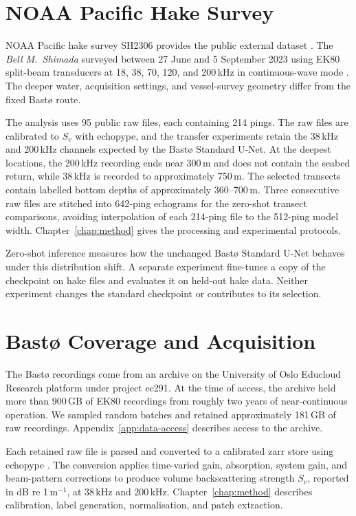 \section{NOAA Pacific Hake Survey}
\label{sec:noaa-transfer}

NOAA Pacific hake survey SH2306 provides the public external dataset \cite{noaa_sh2306_ek80}. The \textit{Bell M.\ Shimada} surveyed between 27 June and 5 September 2023 using EK80 split-beam transducers at 18, 38, 70, 120, and 200\,kHz in continuous-wave mode \cite{clemons_hake_2024}. The deeper water, acquisition settings, and vessel-survey geometry differ from the fixed Bast\o{} route.

The analysis uses 95 public raw files, each containing 214 pings. The raw files are calibrated to $S_v$ with echopype, and the transfer experiments retain the 38\,kHz and 200\,kHz channels expected by the Bast\o{} Standard U-Net. At the deepest locations, the 200\,kHz recording ends near 300\,m and does not contain the seabed return, while 38\,kHz is recorded to approximately 750\,m. The selected transects contain labelled bottom depths of approximately 360--700\,m. Three consecutive raw files are stitched into 642-ping echograms for the zero-shot transect comparisons, avoiding interpolation of each 214-ping file to the 512-ping model width. Chapter~\ref{chap:method} gives the processing and experimental protocols.

Zero-shot inference measures how the unchanged Bast\o{} Standard U-Net behaves under this distribution shift. A separate experiment fine-tunes a copy of the checkpoint on hake files and evaluates it on held-out hake data. Neither experiment changes the standard checkpoint or contributes to its selection.

\section{Bast\o{} Coverage and Acquisition}

The Bast\o{} recordings come from an archive on the University of Oslo Educloud Research platform under project ec291. At the time of access, the archive held more than 900\,GB of EK80 recordings from roughly two years of near-continuous operation. We sampled random batches and retained approximately 181\,GB of raw recordings. Appendix~\ref{app:data-access} describes access to the archive.

Each retained raw file is parsed and converted to a calibrated zarr store using echopype \cite{lee_interoperable_2024}. The conversion applies time-varied gain, absorption, system gain, and beam-pattern corrections to produce volume backscattering strength $S_v$, reported in dB re 1\,m$^{-1}$, at 38\,kHz and 200\,kHz. Chapter~\ref{chap:method} describes calibration, label generation, normalisation, and patch extraction.

